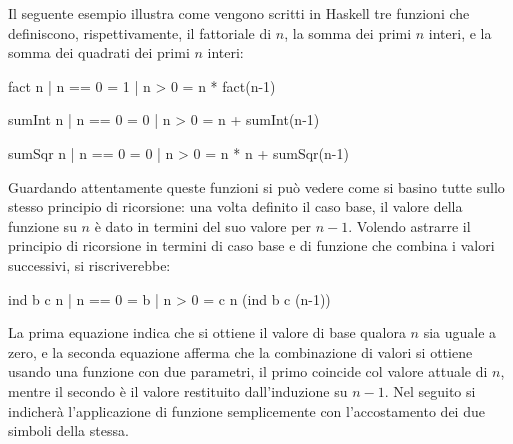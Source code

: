Il seguente esempio illustra come vengono scritti in Haskell tre funzioni che definiscono, rispettivamente, il 
fattoriale di $n$, la somma dei primi $n$ interi, e la somma dei quadrati 
dei primi $n$ interi:
\begin{haskellCode}
fact n  | n == 0  = 1
	| n > 0   = n * fact(n-1)

sumInt n | n == 0  = 0
	 | n > 0   = n + sumInt(n-1)

sumSqr n | n == 0  = 0
	 | n > 0   = n * n + sumSqr(n-1)
\end{haskellCode}
Guardando attentamente queste funzioni si pu\`o vedere come si basino tutte sullo 
stesso principio di ricorsione: una volta definito il caso base, il valore 
della funzione su $n$ \`e dato in termini del suo valore per $n-1$. Volendo astrarre il principio di ricorsione in termini di caso 
base e di funzione che combina i valori successivi, si riscriverebbe:
\begin{haskellCode}
ind b c n | n == 0  = b
	  | n > 0   = c n (ind b c (n-1))
\end{haskellCode}
La prima equazione indica che si ottiene il valore di base qualora $n$ sia uguale a zero, 
e la seconda equazione afferma che la combinazione di valori si 
ottiene usando una funzione con due parametri, il primo coincide col 
valore attuale di $n$, mentre il secondo \`e il valore restituito 
dall'induzione su $n-1$. Nel seguito si indicher\`a l'applicazione di
funzione semplicemente con l'accostamento dei due simboli della stessa.

